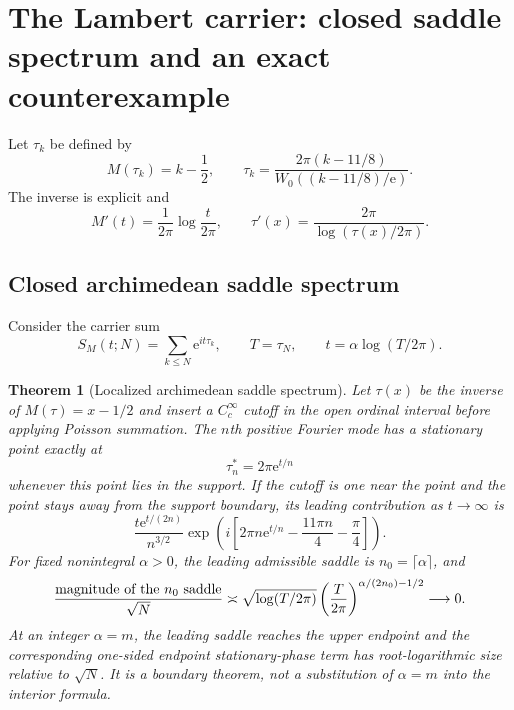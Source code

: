 \documentclass[11pt]{amsart}
\newtheorem{theorem}{Theorem}[section]
\theoremstyle{definition}
\theoremstyle{remark}
\newcommand{\ee}{\mathrm e}
\begin{document}
\section{The Lambert carrier: closed saddle spectrum and an exact counterexample}

Let $\tau_k$ be defined by
\begin{equation}\label{eq:tau}
M(\tau_k)=k-\frac12,
\qquad
\tau_k=\frac{2\pi(k-11/8)}{W_0((k-11/8)/\ee)}.
\end{equation}
The inverse is explicit and
\begin{equation}\label{eq:tau_derivatives}
M'(t)=\frac1{2\pi}\log\frac{t}{2\pi},
\qquad
\tau'(x)=\frac{2\pi}{\log(\tau(x)/2\pi)}.
\end{equation}

\subsection{Closed archimedean saddle spectrum}

Consider the carrier sum
\begin{equation}\label{eq:carrier}
S_M(t;N)=\sum_{k\leq N}\ee^{it\tau_k},
\qquad T=\tau_N,
\qquad t=\alpha\log(T/2\pi).
\end{equation}

\begin{theorem}[Localized archimedean saddle spectrum]\label{thm:saddles}
Let $\tau(x)$ be the inverse of $M(\tau)=x-1/2$ and insert a
$C_c^\infty$ cutoff in the open ordinal interval before applying Poisson
summation.  The $n$th positive Fourier mode has a stationary point exactly at
\begin{equation}\label{eq:saddle_location}
\boxed{\tau_n^*=2\pi\ee^{t/n}}
\end{equation}
whenever this point lies in the support.  If the cutoff is one near the point
and the point stays away from the support boundary, its leading contribution
as $t\to\infty$ is
\begin{equation}\label{eq:saddle_contribution}
\boxed{
\frac{t\ee^{t/(2n)}}{n^{3/2}}
\exp\!\left(i\left[2\pi n\ee^{t/n}-\frac{11\pi n}{4}-\frac\pi4\right]\right).}
\end{equation}
For fixed nonintegral $\alpha>0$, the leading admissible saddle is
$n_0=\lceil\alpha\rceil$, and
\begin{equation}\label{eq:carrier_normalized}
\frac{\textup{magnitude of the }n_0\textup{ saddle}}{\sqrt N}
\asymp
\sqrt{\log(T/2\pi)}
\left(\frac{T}{2\pi}\right)^{\alpha/(2n_0)-1/2}
\longrightarrow0.
\end{equation}
At an integer $\alpha=m$, the leading saddle reaches the upper endpoint and
the corresponding one-sided endpoint stationary-phase term has
root-logarithmic size relative to $\sqrt N$.  It is a boundary theorem, not a
substitution of $\alpha=m$ into the interior formula.
\end{theorem}
\end{document}
